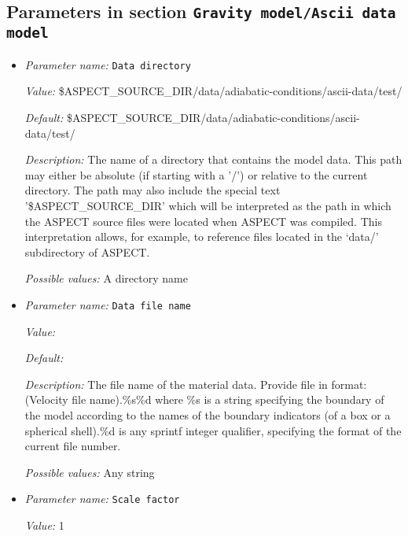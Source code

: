 


\subsection{Parameters in section \tt Gravity model/Ascii data model}
\label{parameters:Gravity_20model/Ascii_20data_20model}

\begin{itemize}
\item {\it Parameter name:} {\tt Data directory}
\label{parameters:Gravity model/Ascii data model/Data directory}


{\it Value:} \$ASPECT\_SOURCE\_DIR/data/adiabatic-conditions/ascii-data/test/


{\it Default:} \$ASPECT\_SOURCE\_DIR/data/adiabatic-conditions/ascii-data/test/


{\it Description:} The name of a directory that contains the model data. This path may either be absolute (if starting with a '/') or relative to the current directory. The path may also include the special text '\$ASPECT\_SOURCE\_DIR' which will be interpreted as the path in which the ASPECT source files were located when ASPECT was compiled. This interpretation allows, for example, to reference files located in the `data/' subdirectory of ASPECT. 


{\it Possible values:} A directory name
\item {\it Parameter name:} {\tt Data file name}
\label{parameters:Gravity model/Ascii data model/Data file name}


{\it Value:} 


{\it Default:} 


{\it Description:} The file name of the material data. Provide file in format: (Velocity file name).\%s\%d where \%s is a string specifying the boundary of the model according to the names of the boundary indicators (of a box or a spherical shell).\%d is any sprintf integer qualifier, specifying the format of the current file number. 


{\it Possible values:} Any string
\item {\it Parameter name:} {\tt Scale factor}
\label{parameters:Gravity model/Ascii data model/Scale factor}


{\it Value:} 1



\end{itemize}
